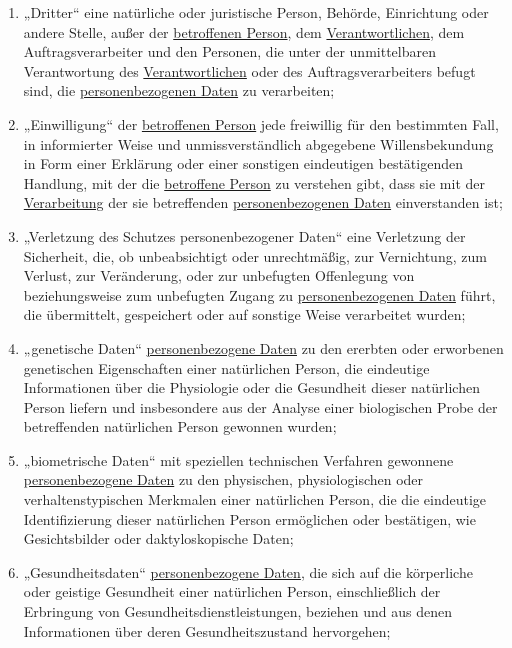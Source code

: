 \begin{enumerate}
  \item „Dritter“ eine natürliche oder juristische Person, Behörde, Einrichtung oder andere Stelle, außer der
   \hyperref[itm:04-1]{betroffenen Person}, dem \hyperref[itm:04-7]{Verantwortlichen}, dem Auftragsverarbeiter und den Personen, die unter der unmittelbaren
   Verantwortung des \hyperref[itm:04-7]{Verantwortlichen} oder des Auftragsverarbeiters befugt sind, die \hyperref[itm:04-1]{personenbezogenen Daten} zu
   verarbeiten;
  \label{itm:04-10}

  \item „Einwilligung“ der \hyperref[itm:04-1]{betroffenen Person} jede freiwillig für den bestimmten Fall, in informierter Weise und
   unmissverständlich abgegebene Willensbekundung in Form einer Erklärung oder einer sonstigen eindeutigen
   bestätigenden Handlung, mit der die \hyperref[itm:04-1]{betroffene Person} zu verstehen gibt, dass sie mit der \hyperref[itm:04-2]{Verarbeitung} der sie
   betreffenden \hyperref[itm:04-1]{personenbezogenen Daten} einverstanden ist;
  \label{itm:04-11}

  \item „Verletzung des Schutzes personenbezogener Daten“ eine Verletzung der Sicherheit, die, ob unbeabsichtigt oder
   unrechtmäßig, zur Vernichtung, zum Verlust, zur Veränderung, oder zur unbefugten Offenlegung von beziehungsweise zum
   unbefugten Zugang zu \hyperref[itm:04-1]{personenbezogenen Daten} führt, die übermittelt, gespeichert oder auf sonstige Weise verarbeitet
   wurden;
  \label{itm:04-12}

  \item „genetische Daten“ \hyperref[itm:04-1]{personenbezogene Daten} zu den ererbten oder erworbenen genetischen Eigenschaften einer
   natürlichen Person, die eindeutige Informationen über die Physiologie oder die Gesundheit dieser natürlichen Person
   liefern und insbesondere aus der Analyse einer biologischen Probe der betreffenden natürlichen Person gewonnen
   wurden;
  \label{itm:04-13}

  \item „biometrische Daten“ mit speziellen technischen Verfahren gewonnene \hyperref[itm:04-1]{personenbezogene Daten} zu den physischen,
   physiologischen oder verhaltenstypischen Merkmalen einer natürlichen Person, die die eindeutige Identifizierung
   dieser natürlichen Person ermöglichen oder bestätigen, wie Gesichtsbilder oder daktyloskopische Daten;
  \label{itm:04-14}

  \item „Gesundheitsdaten“ \hyperref[itm:04-1]{personenbezogene Daten}, die sich auf die körperliche oder geistige Gesundheit einer
   natürlichen Person, einschließlich der Erbringung von Gesundheitsdienstleistungen, beziehen und aus denen
   Informationen über deren Gesundheitszustand hervorgehen;
  \label{itm:04-15}


\end{enumerate}
